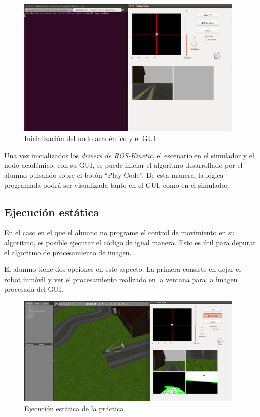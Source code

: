 \begin{figure}[H]
  \begin{center}
    \includegraphics[width=0.98\textwidth]{figures/init_na_fr.png}
		\caption{Inicialización del nodo académico y el GUI}
		\label{fig.inaGfr}
		\end{center}
\end{figure}

Una vez inicializados los \textit{drivers de ROS-Kinetic}, el escenario en el simulador y el nodo académico, con su GUI, se puede iniciar el algoritmo desarrollado por el alumno pulsando sobre el botón ``Play Code''. De esta manera, la lógica programada podrá ser visualizada tanto en el GUI, como en el simulador.

\subsection{Ejecución estática}
En el caso en el que el alumno no programe el control de movimiento en su algoritmo, es posible ejecutar el código de igual manera. Esto es útil para depurar el algoritmo de procesamiento de imagen. 

El alumno tiene dos opciones en este aspecto. La primera consiste en dejar el robot inmóvil y ver el procesamiento realizado en la ventana para la imagen procesada del GUI. 

\begin{figure}[H]
  \begin{center}
    \includegraphics[width=0.98\textwidth]{figures/ejec_estat_fr.png}
		\caption{Ejecución estática de la práctica}
		\label{fig.eefr}
		\end{center}
\end{figure}

